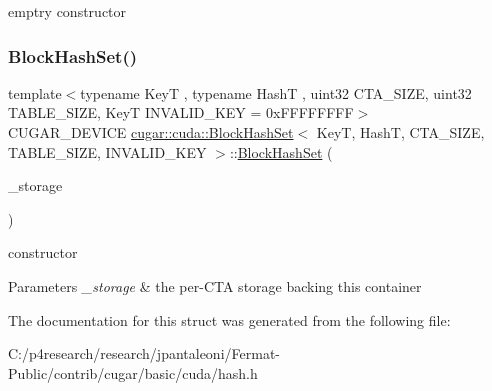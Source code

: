 emptry constructor \mbox{\label{structcugar_1_1cuda_1_1_block_hash_set_aa5ebb1fcc80e0f7e097a383237160587}} 
\subsubsection{\texorpdfstring{Block\+Hash\+Set()}{BlockHashSet()}\hspace{0.1cm}{\footnotesize\ttfamily [2/2]}}
{\footnotesize\ttfamily template$<$typename KeyT , typename HashT , uint32 C\+T\+A\+\_\+\+S\+I\+ZE, uint32 T\+A\+B\+L\+E\+\_\+\+S\+I\+ZE, KeyT I\+N\+V\+A\+L\+I\+D\+\_\+\+K\+EY = 0x\+F\+F\+F\+F\+F\+F\+FF$>$ \\
C\+U\+G\+A\+R\+\_\+\+D\+E\+V\+I\+CE \hyperlink{structcugar_1_1cuda_1_1_block_hash_set}{cugar\+::cuda\+::\+Block\+Hash\+Set}$<$ KeyT, HashT, C\+T\+A\+\_\+\+S\+I\+ZE, T\+A\+B\+L\+E\+\_\+\+S\+I\+ZE, I\+N\+V\+A\+L\+I\+D\+\_\+\+K\+EY $>$\+::\hyperlink{structcugar_1_1cuda_1_1_block_hash_set}{Block\+Hash\+Set} (\begin{DoxyParamCaption}\item[{\hyperlink{structcugar_1_1cuda_1_1_block_hash_set_1_1_temp_storage}{Temp\+Storage} \&}]{\+\_\+storage }\end{DoxyParamCaption})\hspace{0.3cm}{\ttfamily [inline]}}

constructor


\begin{DoxyParams}{Parameters}
{\em \+\_\+storage} & the per-\/\+C\+TA storage backing this container \\
\hline
\end{DoxyParams}


The documentation for this struct was generated from the following file\+:\begin{DoxyCompactItemize}
\item 
C\+:/p4research/research/jpantaleoni/\+Fermat-\/\+Public/contrib/cugar/basic/cuda/hash.\+h\end{DoxyCompactItemize}
